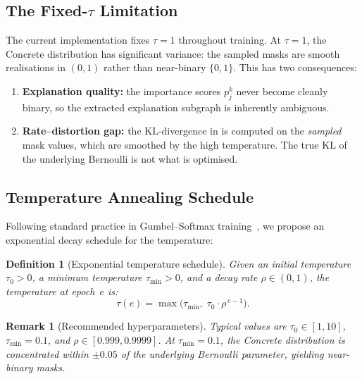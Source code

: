 \documentclass[11pt,a4paper]{article}
\newtheorem{remark}{Remark}
\newtheorem{definition}{Definition}
\newcommand{\KL}{\mathrm{KL}}
\begin{document}
\subsection{The Fixed-$\tau$ Limitation}

The current implementation fixes $\tau = 1$ throughout training. At
$\tau = 1$, the Concrete distribution has significant variance: the
sampled masks are smooth realisations in $(0, 1)$ rather than
near-binary $\{0, 1\}$. This has two consequences:

\begin{enumerate}[leftmargin=*,itemsep=2pt]
  \item \textbf{Explanation quality:} the importance scores $p_j^k$
        never become cleanly binary, so the extracted explanation
        subgraph is inherently ambiguous.
  \item \textbf{Rate--distortion gap:} the $\KL$-divergence in
         is computed on the \emph{sampled} mask
        values, which are smoothed by the high temperature. The true
        $\KL$ of the underlying Bernoulli is not what is optimised.
\end{enumerate}

\subsection{Temperature Annealing Schedule}

Following standard practice in Gumbel--Softmax
training~\cite{maddison2017concrete,jang2016gumbel}, we propose an
exponential decay schedule for the temperature:

\begin{definition}[Exponential temperature schedule]
\label{def:temp_schedule}
Given an initial temperature $\tau_0 > 0$, a minimum temperature
$\tau_{\min} > 0$, and a decay rate $\rho \in (0, 1)$, the temperature
at epoch~$e$ is:
\begin{equation}
\label{eq:temp_schedule}
\tau(e)
  = \max\!\big(\tau_{\min},\; \tau_0 \cdot \rho^{\,e-1}\big).
\end{equation}
\end{definition}

\begin{remark}[Recommended hyperparameters]
Typical values are $\tau_0 \in [1, 10]$, $\tau_{\min} = 0.1$, and
$\rho \in [0.999, 0.9999]$. At $\tau_{\min} = 0.1$, the Concrete
distribution is concentrated within $\pm 0.05$ of the underlying
Bernoulli parameter, yielding near-binary masks.
\end{remark}
\end{document}
